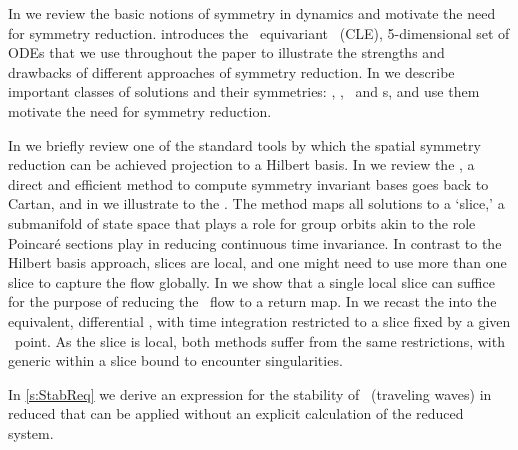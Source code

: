 In  we review the basic notions of symmetry
in dynamics and motivate the need for symmetry reduction.
 introduces the \ equivariant
\cLe\ (CLE),  5-dimensional set of ODEs that we use
throughout the paper to illustrate the strengths
and drawbacks of different approaches of symmetry reduction.
In  we describe important classes of
solutions and their symmetries: \eqva, \reqva, \po\ and \rpo s,
and use them motivate the need for symmetry reduction.

In  we briefly review one of the standard tools
by which the spatial symmetry reduction can be achieved\JFGedit{:}
projection to a Hilbert basis.
In  we review the {\mframes}, a direct and
efficient method to compute symmetry invariant bases 
goes back to Cartan, and in  we
illustrate  to the \cLe. The method
maps all solutions to a `slice,' a submanifold  of state
space that plays a role for group orbits akin to the role
Poincar\'e sections play in reducing continuous time
invariance. In contrast to the Hilbert basis approach, slices
are local, and one might need to use more than one slice to
capture the flow globally. In  we show
that a single local slice can suffice for the purpose of reducing
the \cLe\ flow to a return map.
In  we recast the {\mframes}
into the equivalent, differential \mslices, with 
time integration
restricted to a slice fixed by a given \statesp\ point.
As the slice is local, both methods suffer from the same
restrictions, with generic  within a slice bound to encounter
singularities.

In \ref{s:StabReq} we derive an expression for the stability
of \reqva\ (traveling waves) in reduced 
that can be applied without an explicit
calculation of the reduced system.
